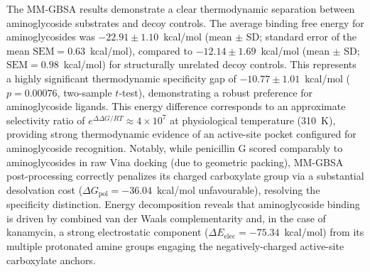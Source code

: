 \documentclass[pdflatex,sn-mathphys-num]{sn-jnl}
\begin{document}
The MM-GBSA results demonstrate a clear thermodynamic separation between aminoglycoside substrates and decoy controls. The average binding free energy for aminoglycosides was $-22.91 \pm 1.10$~kcal/mol (mean $\pm$ SD; standard error of the mean $\text{SEM} = 0.63$~kcal/mol), compared to $-12.14 \pm 1.69$~kcal/mol (mean $\pm$ SD; $\text{SEM} = 0.98$~kcal/mol) for structurally unrelated decoy controls. This represents a highly significant thermodynamic specificity gap of $-10.77 \pm 1.01$~kcal/mol ($p = 0.00076$, two-sample $t$-test), demonstrating a robust preference for aminoglycoside ligands. This energy difference corresponds to an approximate selectivity ratio of $e^{\Delta\Delta G / RT} \approx 4 \times 10^7$ at physiological temperature (310~K), providing strong thermodynamic evidence of an active-site pocket configured for aminoglycoside recognition. Notably, while penicillin G scored comparably to aminoglycosides in raw Vina docking (due to geometric packing), MM-GBSA post-processing correctly penalizes its charged carboxylate group via a substantial desolvation cost ($\Delta G_{\text{pol}} = {-}36.04$~kcal/mol unfavourable), resolving the specificity distinction. Energy decomposition reveals that aminoglycoside binding is driven by combined van der Waals complementarity and, in the case of kanamycin, a strong electrostatic component ($\Delta E_{\text{elec}} = {-}75.34$~kcal/mol) from its multiple protonated amine groups engaging the negatively-charged active-site carboxylate anchors.
\end{document}
